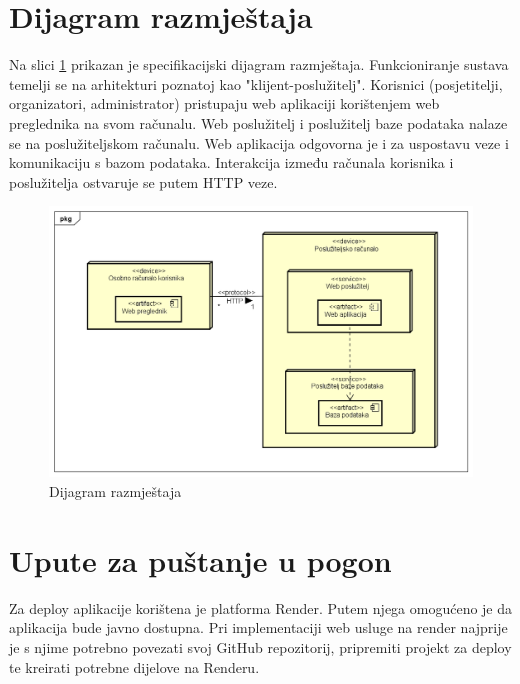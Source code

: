 			
			\eject 
		
		
		\section{Dijagram razmještaja}
		
			Na slici \ref{depd} prikazan je specifikacijski dijagram razmještaja. Funkcioniranje sustava temelji se na arhitekturi poznatoj kao "klijent-poslužitelj". Korisnici (posjetitelji, organizatori, administrator) pristupaju web aplikaciji korištenjem web preglednika na svom računalu. Web poslužitelj i poslužitelj baze podataka nalaze se na poslužiteljskom računalu. Web aplikacija odgovorna je i za uspostavu veze i komunikaciju s bazom podataka. Interakcija između računala korisnika i poslužitelja ostvaruje se putem HTTP veze.
			
			
			\begin{figure}[H]
				\includegraphics[width=\textwidth]{dijagrami/depd.png} 
				\centering
				\vspace{-0.2cm}
				\caption{Dijagram razmještaja}
				\label{depd}
			\end{figure}
			
			
			\eject 
		
		\section{Upute za puštanje u pogon}
		
			
			Za deploy aplikacije korištena je platforma Render. Putem njega omogućeno je da aplikacija bude javno dostupna. Pri implementaciji web usluge na render najprije je s njime potrebno povezati svoj GitHub repozitorij, pripremiti projekt za deploy te kreirati potrebne dijelove na Renderu.
			
